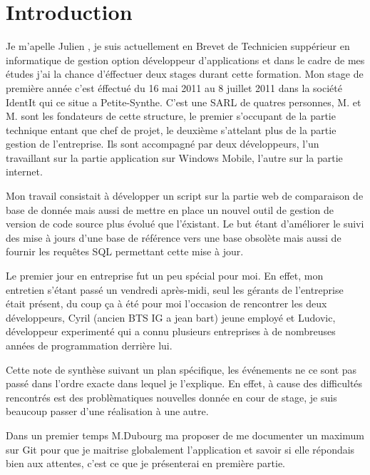\chapter{Introduction}

Je m'apelle Julien , je suis actuellement en Brevet de Technicien suppérieur en informatique de gestion option développeur d'applications et dans le cadre de
mes études j'ai la chance d'éffectuer deux stages durant cette formation. Mon stage de première année c'est éffectué du 16 mai 2011 au 8 juillet 2011 dans la société IdentIt
qui ce situe a Petite-Synthe. C'est une SARL de quatres personnes, M. et M. sont les fondateurs de cette structure, le premier s'occupant de la
partie technique entant que chef de projet, le deuxième s'attelant plus de la partie gestion de l'entreprise. Ils sont accompagné par deux développeurs, l'un travaillant sur
la partie application sur Windows Mobile, l'autre sur la partie internet.

Mon travail consistait à développer un script sur la partie web de comparaison de base de donnée mais aussi de mettre en place un nouvel outil de gestion de version de code
source plus évolué que l'éxistant. Le but étant d'améliorer le suivi des mise à jours d'une base de référence vers une base obsolète mais aussi de fournir les requêtes SQL
permettant cette mise à jour.

Le premier jour en entreprise fut un peu spécial pour moi. En effet, mon entretien s'étant passé un vendredi après-midi, seul les gérants de l'entreprise était présent, du
coup ça à été pour moi l'occasion de rencontrer les deux développeurs, Cyril (ancien BTS IG a jean bart) jeune employé et Ludovic, développeur experimenté qui a connu
plusieurs entreprises à de nombreuses années de programmation derrière lui.

Cette note de synthèse suivant un plan spécifique, les événements ne ce sont pas passé dans l'ordre exacte dans lequel je l'explique. En effet, à cause des difficultés
rencontrés est des problèmatiques nouvelles donnée en cour de stage, je suis beaucoup passer d'une réalisation à une autre.

Dans un premier temps M.Dubourg ma proposer de me documenter un maximum sur Git pour que je maitrise globalement l'application et savoir si elle
répondais bien aux attentes, c'est ce que je présenterai en première partie.

\clearpage

